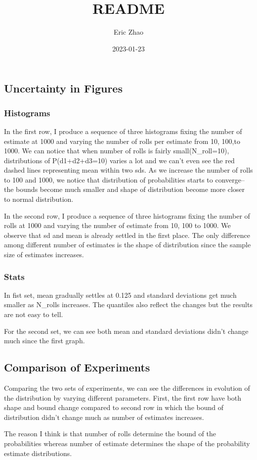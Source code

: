 \documentclass[
]{article}
\title{README}
\author{Eric Zhao}
\date{2023-01-23}
\begin{document}
\maketitle

\hypertarget{uncertainty-in-figures}{%
\subsection{Uncertainty in Figures}\label{uncertainty-in-figures}}

\hypertarget{histograms}{%
\subsubsection{Histograms}\label{histograms}}

In the first row, I produce a sequence of three histograms fixing the
number of estimate at 1000 and varying the number of rolls per estimate
from 10, 100,to 1000. We can notice that when number of rolls is fairly
small(N\_roll=10), distributions of P(d1+d2+d3=10) varies a lot and we
can't even see the red dashed lines representing mean within two sds. As
we increase the number of rolls to 100 and 1000, we notice that
distribution of probabilities starts to converge--the bounds become much
smaller and shape of distribution become more closer to normal
distribution.

In the second row, I produce a sequence of three histograms fixing the
number of rolls at 1000 and varying the number of estimate from 10, 100
to 1000. We observe that sd and mean is already settled in the first
place. The only difference among different number of estimates is the
shape of distribution since the sample size of estimates increases.

\hypertarget{stats}{%
\subsubsection{Stats}\label{stats}}

In fist set, mean gradually settles at 0.125 and standard deviations get
much smaller as N\_rolls increases. The quantiles also reflect the
changes but the results are not easy to tell.

For the second set, we can see both mean and standard deviations didn't
change much since the first graph.

\hypertarget{comparison-of-experiments}{%
\subsection{Comparison of Experiments}\label{comparison-of-experiments}}

Comparing the two sets of experiments, we can see the differences in
evolution of the distribution by varying different parameters. First,
the first row have both shape and bound change compared to second row in
which the bound of distribution didn't change much as number of
estimates increases.

The reason I think is that number of rolls determine the bound of the
probabilities whereas number of estimate determines the shape of the
probability estimate distributions.
\end{document}
